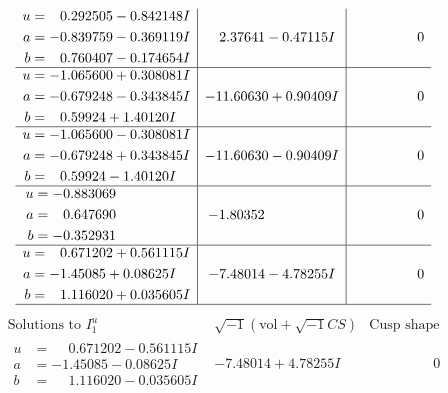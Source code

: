 \documentclass[1p]{elsarticle_modified}
\theoremstyle{definition}
\newcommand{\I}{\sqrt{-1}}
\begin{document}
$$\begin{array}{c|c|c}
\begin{aligned}
u &= \phantom{-}0.292505 - 0.842148 I \\
a &= -0.839759 - 0.369119 I \\
b &= \phantom{-}0.760407 - 0.174654 I\end{aligned}
 & \phantom{-}2.37641 - 0.47115 I & \phantom{-0.000000 } 0 \\ \hline\begin{aligned}
u &= -1.065600 + 0.308081 I \\
a &= -0.679248 - 0.343845 I \\
b &= \phantom{-}0.59924 + 1.40120 I\end{aligned}
 & -11.60630 + 0.90409 I & \phantom{-0.000000 } 0 \\ \hline\begin{aligned}
u &= -1.065600 - 0.308081 I \\
a &= -0.679248 + 0.343845 I \\
b &= \phantom{-}0.59924 - 1.40120 I\end{aligned}
 & -11.60630 - 0.90409 I & \phantom{-0.000000 } 0 \\ \hline\begin{aligned}
u &= -0.883069\phantom{ +0.000000I} \\
a &= \phantom{-}0.647690\phantom{ +0.000000I} \\
b &= -0.352931\phantom{ +0.000000I}\end{aligned}
 & -1.80352\phantom{ +0.000000I} & \phantom{-0.000000 } 0 \\ \hline\begin{aligned}
u &= \phantom{-}0.671202 + 0.561115 I \\
a &= -1.45085 + 0.08625 I \\
b &= \phantom{-}1.116020 + 0.035605 I\end{aligned}
 & -7.48014 - 4.78255 I & \phantom{-0.000000 } 0\\
 \hline 
 \end{array}$$\newpage$$\begin{array}{c|c|c}  
\text{Solutions to }I^u_{1}& \I (\text{vol} + \sqrt{-1}CS) & \text{Cusp shape}\\
 \hline 
\begin{aligned}
u &= \phantom{-}0.671202 - 0.561115 I \\
a &= -1.45085 - 0.08625 I \\
b &= \phantom{-}1.116020 - 0.035605 I\end{aligned}
 & -7.48014 + 4.78255 I & \phantom{-0.000000 } 0 \\ \hline\begin{aligned}

\end{aligned}
\end{array}$$
\end{document}
